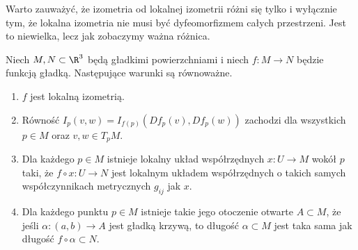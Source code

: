 \begin{frame}[<+->]


\begin{uwaga}

Warto zauważyć, że izometria od lokalnej izometrii różni się tylko i wyłącznie tym, że lokalna izometria nie musi być dyfeomorfizmem całych przestrzeni. Jest to niewielka, lecz jak zobaczymy ważna różnica.

\end{uwaga}

\end{frame}
\begin{frame}[<+->]

\begin{lemat}\label{lem:loc-isometry-prop}
Niech $M,N\subset \R^3$ będą gładkimi powierzchniami i niech $f\colon M\to N$ będzie funkcją gładką. Następujące warunki są równoważne.

\begin{enumerate}
\item $f$ jest lokalną izometrią.
\item Równość $I_p(v,w)=I_{f(p)}(Df_p(v),Df_p(w))$ zachodzi dla wszystkich $p\in M$ oraz $v,w\in T_pM$.

\item Dla każdego $p\in M$ istnieje lokalny układ współrzędnych $x\colon U\to M$ wokół $p$ taki, że $f\circ x\colon U\to N$ jest lokalnym układem współrzędnych o takich samych współczynnikach metrycznych $g_{ij}$ jak $x$.

\item Dla każdego punktu $p\in M$ istnieje takie jego otoczenie otwarte $A\subset M$, że jeśli $\alpha \colon(a,b)\to A$ jest gładką krzywą, to długość $\alpha\subset M$ jest taka sama jak długość $f\circ \alpha\subset N$.
\end{enumerate}
\end{lemat}
\end{frame}
